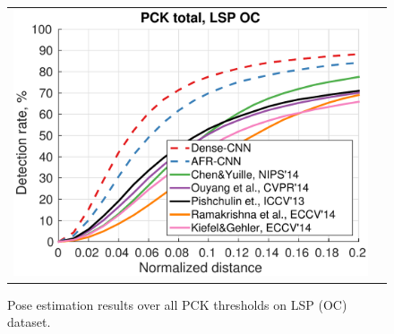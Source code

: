 \begin{figure}
  \centering
  \begin{tabular}{c c}  
  \includegraphics[width=0.6\linewidth]{pck-total-lsp-OC.pdf}&
  \end{tabular}
  \caption{Pose estimation results over all PCK thresholds on LSP (OC) dataset.} 
  \vspace{0.2em}
  \label{fig:pck-curves:lsp:oc}
   \vspace{-1.0em}
\end{figure}
